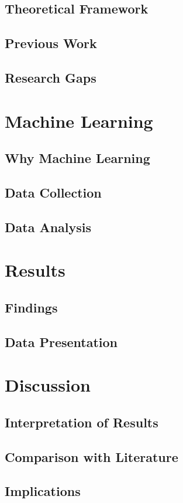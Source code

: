 \documentclass[12pt,a4paper]{report}
\begin{document}
\section{Theoretical Framework}
\section{Previous Work}
\section{Research Gaps}

\chapter{Machine Learning}
\section{Why Machine Learning}
\section{Data Collection}
\section{Data Analysis}

\chapter{Results}
\section{Findings}
\section{Data Presentation}

\chapter{Discussion}
\section{Interpretation of Results}
\section{Comparison with Literature}
\section{Implications}
\end{document}
